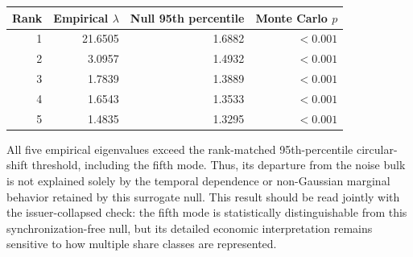 \begin{center}
\label{tab:rmt_circular_shift_null}
\begin{tabular}{rrrr}
\toprule
Rank & Empirical $\lambda$ & Null 95th percentile & Monte Carlo $p$ \\
\midrule
1 & 21.6505 & 1.6882 & $<0.001$ \\
2 & 3.0957 & 1.4932 & $<0.001$ \\
3 & 1.7839 & 1.3889 & $<0.001$ \\
4 & 1.6543 & 1.3533 & $<0.001$ \\
5 & 1.4835 & 1.3295 & $<0.001$ \\
\bottomrule
\end{tabular}
\end{center}
\GlobalPrecisionNote

All five empirical eigenvalues exceed the rank-matched 95th-percentile circular-shift threshold, including the fifth mode. Thus, its departure from the noise bulk is not explained solely by the temporal dependence or non-Gaussian marginal behavior retained by this surrogate null. This result should be read jointly with the issuer-collapsed check: the fifth mode is statistically distinguishable from this synchronization-free null, but its detailed economic interpretation remains sensitive to how multiple share classes are represented.
